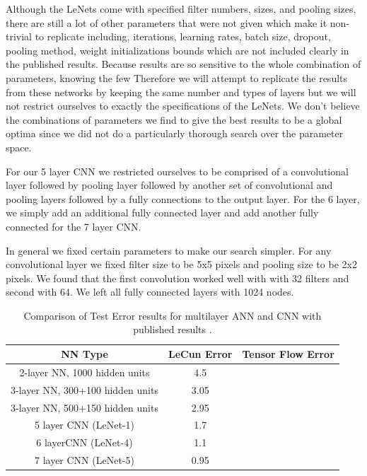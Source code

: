 \documentclass[12pt, twocolumn]{article}
\begin{document}
Although the LeNets come with specified filter numbers, sizes, and pooling sizes, there are still a lot of other parameters that were not given which make it non-trivial to replicate including, iterations, learning rates, batch size, dropout, pooling method, weight initializations bounds which are not included clearly in the published results. Because results are so sensitive to the whole combination of parameters, knowing the few  Therefore we will attempt to replicate the results from these networks by keeping the same number and types of layers but we will not restrict ourselves to exactly the specifications of the LeNets. We don't  believe the combinations of parameters we find to give the best results to be a global optima since we did not do a particularly thorough search over the parameter space. 

For our 5 layer CNN we restricted ourselves to be comprised of a convolutional layer followed by pooling layer followed by another set of convolutional and pooling layers followed by a fully connections to the output layer. For the 6 layer, we simply add an additional fully connected layer and add another fully connected for the 7 layer CNN. 


In general we fixed certain parameters to make our search simpler. For any convolutional layer we fixed filter size to be 5x5 pixels and pooling size to be 2x2 pixels. We found that the first convolution worked well with with 32 filters and second with 64.   We left all fully connected layers with 1024 nodes. 



\begin{table}[t]
\begin{center}
\begin{tabular} { |c | c | c | }
    \hline
    NN Type & LeCun Error  &   Tensor Flow Error \\ \hline
    2-layer NN, 1000 hidden units & 4.5  & \\ \hline
    3-layer NN, 300+100 hidden units & 3.05  &  \\ \hline
    3-layer NN, 500+150 hidden units & 2.95  & \\ \hline
    5 layer CNN  (LeNet-1) & 1.7  & \\ \hline 
    6 layerCNN (LeNet-4) & 1.1 & \\ \hline 
    7 layer CNN (LeNet-5) &  0.95  &\\ \hline
\end{tabular}
\label{table: MNISTLeCun}
\caption{Comparison of Test Error results for multilayer ANN and CNN with published results \cite{LeCun1998}.}
\end{center}
\end{table}
\end{document}
